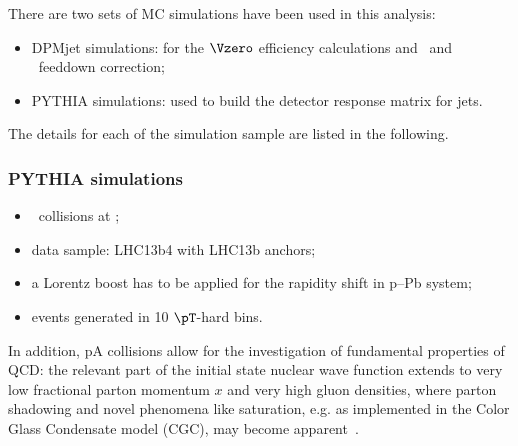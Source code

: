 

There are two sets of MC simulations have been used in this analysis:
\begin{itemize}
\item DPMjet simulations: for the $\Vzero$ efficiency calculations
      and \lda\ and \alda\ feeddown correction;
\item PYTHIA simulations: used to build the detector response matrix for jets.
\end{itemize}
The details for each of the simulation sample are listed in the following.

\subsubsection{PYTHIA simulations}\label{sec:03PySampleMC}

\begin{itemize}
\item \pp\ collisions at ;
\item data sample: LHC13b4 with LHC13b anchors;
\item a Lorentz boost has to be applied for the rapidity shift in p--Pb system;
\item events generated in 10 $\pT$-hard bins.
\end{itemize}


In addition, pA collisions allow for the
investigation of fundamental properties of QCD: the relevant part of
the initial state nuclear wave function extends to very low fractional
parton momentum $x$ and very high gluon densities, where parton
shadowing and novel phenomena like saturation, e.g. as implemented in
the Color Glass Condensate model (CGC), may become
apparent~\cite{McLerran:1993ni, Gelis:2010nm}. 


